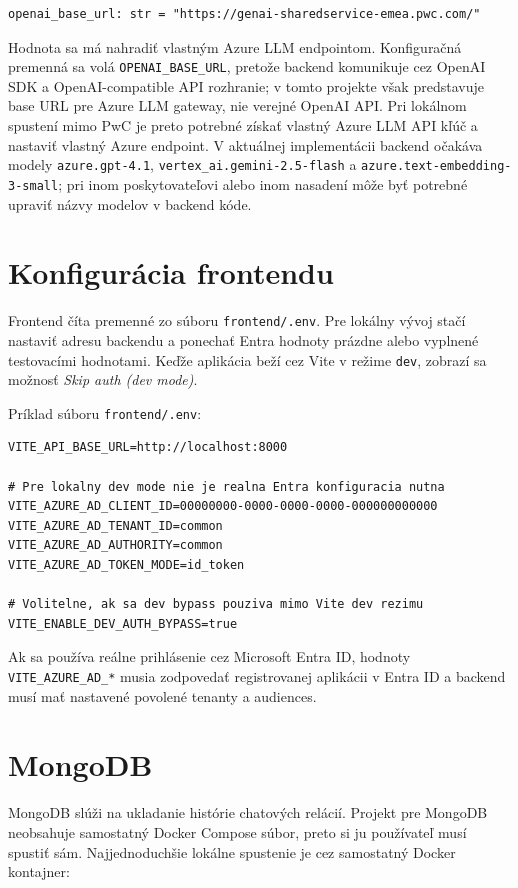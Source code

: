 \documentclass[a4paper, 12pt]{article}
\begin{document}
\begin{lstlisting}
openai_base_url: str = "https://genai-sharedservice-emea.pwc.com/"
\end{lstlisting}

Hodnota sa má nahradiť vlastným Azure LLM endpointom. Konfiguračná premenná sa volá \texttt{OPENAI\_BASE\_URL}, pretože backend komunikuje cez OpenAI SDK a OpenAI-compatible API rozhranie; v tomto projekte však predstavuje base URL pre Azure LLM gateway, nie verejné OpenAI API. Pri lokálnom spustení mimo PwC je preto potrebné získať vlastný Azure LLM API kľúč a nastaviť vlastný Azure endpoint. V aktuálnej implementácii backend očakáva modely \texttt{azure.gpt-4.1}, \texttt{vertex\_ai.gemini-2.5-flash} a \texttt{azure.text-embedding-3-small}; pri inom poskytovateľovi alebo inom nasadení môže byť potrebné upraviť názvy modelov v backend kóde.
\clearpage
\section{Konfigurácia frontendu}

Frontend číta premenné zo súboru \texttt{frontend/.env}. Pre lokálny vývoj stačí nastaviť adresu backendu a ponechať Entra hodnoty prázdne alebo vyplnené testovacími hodnotami. Keďže aplikácia beží cez Vite v režime \texttt{dev}, zobrazí sa možnosť \textit{Skip auth (dev mode)}.

Príklad súboru \texttt{frontend/.env}:

\begin{lstlisting}
VITE_API_BASE_URL=http://localhost:8000

# Pre lokalny dev mode nie je realna Entra konfiguracia nutna
VITE_AZURE_AD_CLIENT_ID=00000000-0000-0000-0000-000000000000
VITE_AZURE_AD_TENANT_ID=common
VITE_AZURE_AD_AUTHORITY=common
VITE_AZURE_AD_TOKEN_MODE=id_token

# Volitelne, ak sa dev bypass pouziva mimo Vite dev rezimu
VITE_ENABLE_DEV_AUTH_BYPASS=true
\end{lstlisting}

Ak sa používa reálne prihlásenie cez Microsoft Entra ID, hodnoty \texttt{VITE\_AZURE\_AD\_*} musia zodpovedať registrovanej aplikácii v Entra ID a backend musí mať nastavené povolené tenanty a audiences.
\clearpage

\section{MongoDB}

MongoDB slúži na ukladanie histórie chatových relácií. Projekt pre MongoDB neobsahuje samostatný Docker Compose súbor, preto si ju používateľ musí spustiť sám. Najjednoduchšie lokálne spustenie je cez samostatný Docker kontajner:
\end{document}
